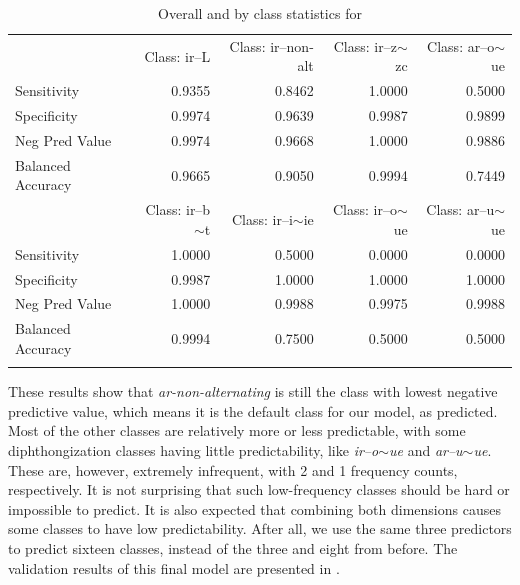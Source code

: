\begin{table}
\begin{tabular}{lrrrr}
 & Class: ir--L &Class: ir--non-alt& Class: ir--z$\sim$zc& Class: ar--o$\sim$ue\\

    Sensitivity         &       0.9355 &            0.8462&          1.0000&          0.5000\\
    Specificity         &       0.9974 &            0.9639&          0.9987&          0.9899\\
    Neg Pred Value      &       0.9974 &            0.9668&          1.0000&          0.9886\\
    Balanced Accuracy   &       0.9665 &            0.9050&          0.9994&          0.7449\\

 &Class: ir--b$\sim$t& Class: ir--i$\sim$ie& Class: ir--o$\sim$ue& Class: ar--u$\sim$ue\\

    Sensitivity          &         1.0000&          0.5000&          0.0000&          0.0000\\
    Specificity          &         0.9987&          1.0000&          1.0000&          1.0000\\
    Neg Pred Value       &         1.0000&          0.9988&          0.9975&          0.9988\\
    Balanced Accuracy    &         0.9994&          0.7500&          0.5000&          0.5000\\
    \lspbottomrule
\end{tabular}
  \caption{Overall and by class statistics for }
  \label{tab:spanish-verbs-class-v-stats}
\end{table}

These results show that \textit{ar-non-alternating} is still the class with lowest negative predictive value, which means it is the default class for our model, as predicted. Most of the other classes are relatively more or less predictable, with some diphthongization classes having little predictability, like \textit{ir--o$\sim$ue} and \textit{ar--u$\sim$ue}. These are, however, extremely infrequent, with 2 and 1 frequency counts, respectively. It is not surprising that such low-frequency classes should be hard or impossible to predict. It is also expected that combining both dimensions causes some classes to have low predictability. After all, we use the same three predictors to predict sixteen classes, instead of the three and eight from before. The validation results of this final model are presented in .%

